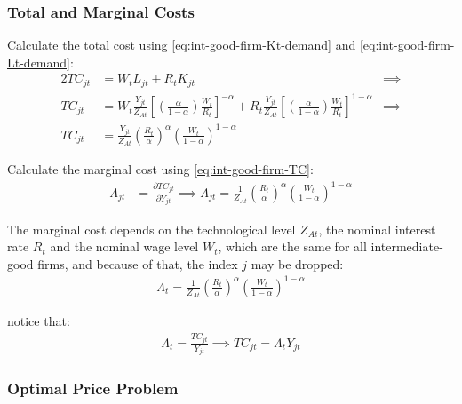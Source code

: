 \documentclass[
	12pt, 
	]{article}
\numberwithin{equation}{section}
\theoremstyle{definition}
\theoremstyle{plain}
\theoremstyle{plain}
\theoremstyle{plain}
\begin{document}
\subsubsection*{Total and Marginal Costs}

Calculate the total cost using \ref{eq:int-good-firm-Kt-demand} and \ref{eq:int-good-firm-Lt-demand}:
\begin{alignat}{2}
	TC_{jt} & = W_t L_{jt} + R_t K_{jt} &\implies \nonumber \\
	TC_{jt} & = W_t \frac{Y_{jt}}{Z_{At}} \left[ \left( \frac{\alpha}{1-\alpha} \right) \frac{W_t}{R_t} \right]^{-\alpha} + R_t \frac{Y_{jt}}{Z_{At}} \left[ \left( \frac{\alpha}{1-\alpha} \right) \frac{W_t}{R_t} \right]^{1-\alpha} &\implies \nonumber \\
	TC_{jt} & = \frac{Y_{jt}}{Z_{At}} \left( \frac{R_t}{\alpha} \right)^{\alpha} \left( \frac{W_t}{1-\alpha} \right)^{1-\alpha} \label{eq:int-good-firm-TC}
\end{alignat}


Calculate the marginal cost using \ref{eq:int-good-firm-TC}: 
\begin{align}
\label{eq:int-good-firm-MC}
	\Lambda_{jt} & = \frac{\partial TC_{jt}}{\partial Y_{jt}}
\implies 
	\Lambda_{jt} = \frac{1}{Z_{At}} \left( \frac{R_t}{\alpha} \right)^{\alpha} \left( \frac{W_t}{1-\alpha} \right)^{1-\alpha}
\end{align}

The marginal cost depends on the technological level $Z_{At}$, the nominal interest rate $R_t$ and the nominal wage level $W_t$, which are the same for all intermediate-good firms, and because of that, the index $j$ may be dropped:
\begin{align}
	\label{eq:int-good-firm-MC-2}
	\Lambda_t = \frac{1}{Z_{At}} \left( \frac{R_t}{\alpha} \right)^{\alpha} \left( \frac{W_t}{1-\alpha} \right)^{1-\alpha}
\end{align}

notice that:
\begin{align}
\label{eq:int-good-firm-TC-MC}
	\Lambda_t = \frac{TC_{jt}}{Y_{jt}} \implies 
	TC_{jt} = \Lambda_t Y_{jt}
\end{align}


\subsubsection*{Optimal Price Problem}
\end{document}
